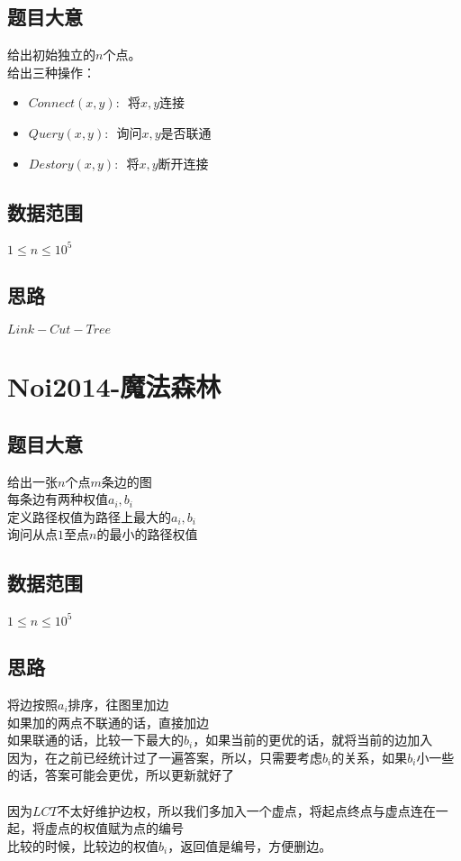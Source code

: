 \documentclass{ctexart}
\numberwithin{equation}{section}
\begin{document}
\begin{flushleft}
  \subsection{题目大意}
  给出初始独立的$n$个点。\\
  给出三种操作：\\
  \begin{itemize}
  \item $Connect(x,y):$\, 将$x,y$连接
  \item $Query(x,y):$\, 询问$x,y$是否联通
  \item $Destory(x,y):$\, 将$x,y$断开连接
  \end{itemize}
  \subsection{数据范围}
  $1\le n \le 10^5$
  \subsection{思路}
  $Link-Cut-Tree$\\
  \newpage

  \section{Noi2014-魔法森林}
  \subsection{题目大意}
  给出一张$n$个点$m$条边的图\\
  每条边有两种权值$a_i,b_i$\\
  定义路径权值为路径上最大的$a_i,b_i$\\
  询问从点$1$至点$n$的最小的路径权值\\
  \subsection{数据范围}
  $1\le n \le 10^5$
  \subsection{思路}
  将边按照$a_i$排序，往图里加边\\
  如果加的两点不联通的话，直接加边\\
  如果联通的话，比较一下最大的$b_i$，如果当前的更优的话，就将当前的边加入\\
  因为，在之前已经统计过了一遍答案，所以，只需要考虑$b_i$的关系，如果$b_i$小一些的话，答案可能会更优，所以更新就好了\\
  ~\\
  因为$LCT$不太好维护边权，所以我们多加入一个虚点，将起点终点与虚点连在一起，将虚点的权值赋为点的编号\\
  比较的时候，比较边的权值$b_i$，返回值是编号，方便删边。\\
  \newpage


\end{flushleft}
\end{document}
